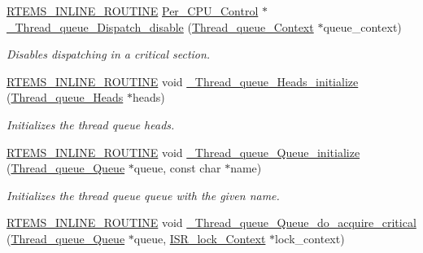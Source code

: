 \begin{DoxyCompactItemize}
\mbox{\hyperlink{group__RTEMSScoreBaseDefs_gac216239df231d5dbd15e3520b0b9313f}{R\+T\+E\+M\+S\+\_\+\+I\+N\+L\+I\+N\+E\+\_\+\+R\+O\+U\+T\+I\+NE}} \mbox{\hyperlink{structPer__CPU__Control}{Per\+\_\+\+C\+P\+U\+\_\+\+Control}} $\ast$ \mbox{\hyperlink{group__RTEMSScoreThreadQueue_ga8dcef3658d8266b9f66015474e2c88bd}{\+\_\+\+Thread\+\_\+queue\+\_\+\+Dispatch\+\_\+disable}} (\mbox{\hyperlink{structThread__queue__Context}{Thread\+\_\+queue\+\_\+\+Context}} $\ast$queue\+\_\+context)
\begin{DoxyCompactList}\small\item\em Disables dispatching in a critical section. \end{DoxyCompactList}\item 
\mbox{\hyperlink{group__RTEMSScoreBaseDefs_gac216239df231d5dbd15e3520b0b9313f}{R\+T\+E\+M\+S\+\_\+\+I\+N\+L\+I\+N\+E\+\_\+\+R\+O\+U\+T\+I\+NE}} void \mbox{\hyperlink{group__RTEMSScoreThreadQueue_gaed8b973ae28379dbf863c01f10c993f3}{\+\_\+\+Thread\+\_\+queue\+\_\+\+Heads\+\_\+initialize}} (\mbox{\hyperlink{group__RTEMSScoreThreadQueue_gaebac32033b009cc8f606a90bd389f8e9}{Thread\+\_\+queue\+\_\+\+Heads}} $\ast$heads)
\begin{DoxyCompactList}\small\item\em Initializes the thread queue heads. \end{DoxyCompactList}\item 
\mbox{\hyperlink{group__RTEMSScoreBaseDefs_gac216239df231d5dbd15e3520b0b9313f}{R\+T\+E\+M\+S\+\_\+\+I\+N\+L\+I\+N\+E\+\_\+\+R\+O\+U\+T\+I\+NE}} void \mbox{\hyperlink{group__RTEMSScoreThreadQueue_ga9bf4b585322581d70c742c7292bc8435}{\+\_\+\+Thread\+\_\+queue\+\_\+\+Queue\+\_\+initialize}} (\mbox{\hyperlink{structThread__queue__Queue}{Thread\+\_\+queue\+\_\+\+Queue}} $\ast$queue, const char $\ast$name)
\begin{DoxyCompactList}\small\item\em Initializes the thread queue queue with the given name. \end{DoxyCompactList}\item 
\mbox{\hyperlink{group__RTEMSScoreBaseDefs_gac216239df231d5dbd15e3520b0b9313f}{R\+T\+E\+M\+S\+\_\+\+I\+N\+L\+I\+N\+E\+\_\+\+R\+O\+U\+T\+I\+NE}} void \mbox{\hyperlink{group__RTEMSScoreThreadQueue_gaca9472b4bf5091cab34d1a4099e4cfa6}{\+\_\+\+Thread\+\_\+queue\+\_\+\+Queue\+\_\+do\+\_\+acquire\+\_\+critical}} (\mbox{\hyperlink{structThread__queue__Queue}{Thread\+\_\+queue\+\_\+\+Queue}} $\ast$queue, \mbox{\hyperlink{structISR__lock__Context}{I\+S\+R\+\_\+lock\+\_\+\+Context}} $\ast$lock\+\_\+context)

\end{DoxyCompactItemize}
